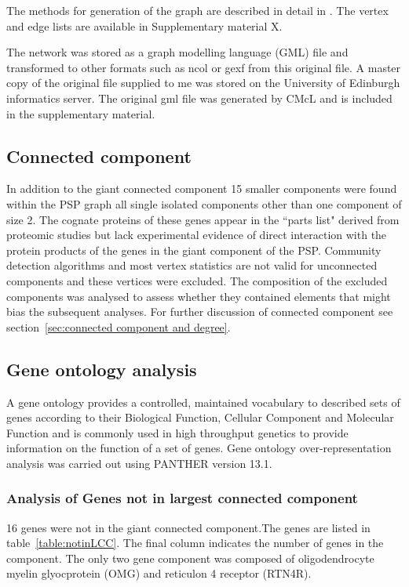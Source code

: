 The methods for generation of the graph are described in detail in \cite{heil2018systems}. The vertex and edge lists are available in Supplementary material X. 

The network was stored as a graph modelling language (GML) file and transformed to other formats such as ncol or gexf from this original file.\cite{himsolt1997gml}  A master copy of the original file supplied to me was stored on the University of Edinburgh informatics server. The original gml file was generated by CMcL and is included in the supplementary material.

\subsection{Connected component}
\label{sec: PSP graph connected component and missing}
In addition to the giant connected component 15 smaller components were found within the PSP graph all single isolated components other than one component of size 2. The cognate proteins of these genes appear in the ``parts list" derived from proteomic studies but lack experimental evidence of direct interaction with the protein products of the genes in the giant component of the PSP. Community detection algorithms and most vertex statistics are not valid for unconnected components and these vertices were excluded. The composition of the excluded components was analysed  to assess whether they contained elements that might bias the subsequent analyses.  For further discussion of connected component see section~\ref{sec:connected component and degree}.

\subsection{Gene ontology analysis}
\label{sec: gene ontology analysis}
A gene ontology provides a controlled, maintained vocabulary to described sets of genes according to their Biological Function, Cellular Component and Molecular Function and is commonly used in high throughput genetics to provide information on the function of a set of genes. \cite{ashburner2000gene}
Gene ontology over-representation analysis was carried out using PANTHER version 13.1.\cite{mi2013large}



\subsubsection{Analysis of Genes not in largest connected component}
16 genes were not in the giant connected component.The genes are listed in table~\ref{table:notinLCC}. The final column indicates the number of genes in the component. The only two gene component was composed of oligodendrocyte myelin glyocprotein (OMG) and reticulon 4 receptor (RTN4R). 

